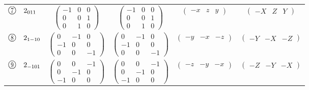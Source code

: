 \documentclass[fleqn,10pt,landscape]{jsarticle}
\begin{document}
\begin{center}
\begin{longtable}{lcccc}
$ {\ooalign{\hfil\resizebox{.8\width}{\height}{7}\hfil\crcr\raise.1ex\hbox{\large$\bigcirc$}}}\quad 2{}_{011} $ & $ \begin{pmatrix} -1 & 0 & 0 \\ 0 & 0 & 1 \\ 0 & 1 & 0 \end{pmatrix} $ & $ \begin{pmatrix} -1 & 0 & 0 \\ 0 & 0 & 1 \\ 0 & 1 & 0 \end{pmatrix} $ & $ \begin{pmatrix} - x & z & y \end{pmatrix} $ & $ \begin{pmatrix} - X & Z & Y \end{pmatrix} $ \\
$ {\ooalign{\hfil\resizebox{.8\width}{\height}{8}\hfil\crcr\raise.1ex\hbox{\large$\bigcirc$}}}\quad 2{}_{1-10} $ & $ \begin{pmatrix} 0 & -1 & 0 \\ -1 & 0 & 0 \\ 0 & 0 & -1 \end{pmatrix} $ & $ \begin{pmatrix} 0 & -1 & 0 \\ -1 & 0 & 0 \\ 0 & 0 & -1 \end{pmatrix} $ & $ \begin{pmatrix} - y & - x & - z \end{pmatrix} $ & $ \begin{pmatrix} - Y & - X & - Z \end{pmatrix} $ \\
$ {\ooalign{\hfil\resizebox{.8\width}{\height}{9}\hfil\crcr\raise.1ex\hbox{\large$\bigcirc$}}}\quad 2{}_{-101} $ & $ \begin{pmatrix} 0 & 0 & -1 \\ 0 & -1 & 0 \\ -1 & 0 & 0 \end{pmatrix} $ & $ \begin{pmatrix} 0 & 0 & -1 \\ 0 & -1 & 0 \\ -1 & 0 & 0 \end{pmatrix} $ & $ \begin{pmatrix} - z & - y & - x \end{pmatrix} $ & $ \begin{pmatrix} - Z & - Y & - X \end{pmatrix} $ \\

\end{longtable}
\end{center}
\end{document}
